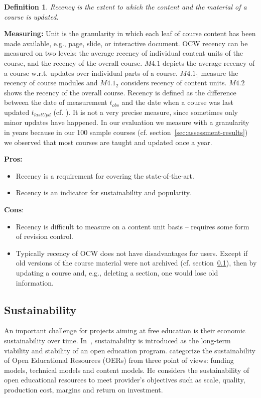 \documentclass{sig-alternate}
\theoremstyle{definition}
\newtheorem{defn}{Definition}
\begin{document}
\begin{defn}
\emph{Recency is the extent to which the content and the material of a course is updated.}
\end{defn}

\noindent\textbf{Measuring:}
Unit is the granularity in which each leaf of course content has been made available, e.g., page, slide, or interactive document.
OCW recency can be measured on two levels: the average recency of individual content units of the course, and the recency of the overall course.
$M4.1$ depicts the average recency of a course w.r.t. updates over individual parts of a course.
$M4.1_1$ measure the recency of course modules and $M4.1_2$ considers recency of content units. 
$M4.2$ shows the recency of the overall course.
Recency is defined as the difference between the date of measurement $t_{\mathit{obs}}$ and the date when a course was last updated $t_{\mathit{lastUpd}}$ (cf. \parencite{BaezaYates.2004}).
It is not a very precise measure, since sometimes only minor updates have happened.
In our evaluation we measure with a granularity in years because in our 100 sample courses (cf. section~\ref{sec:assessment-results}) we observed that most courses are taught and updated once a year.

\noindent\textbf{Pros:}
\begin{itemize}
\item Recency is a requirement for covering the state-of-the-art.
\item Recency is an indicator for sustainability and popularity.
\end{itemize}
\noindent\textbf{Cons}:
\begin{itemize}
\item Recency is difficult to measure on a content unit basis -- requires some form of revision control.
\item Typically recency of OCW does not have disadvantages for users.
Except if old versions of the course material were not archived (cf. section~\ref{sec:sustainability}), then by updating a course and, e.g., deleting a section, one would lose old information.
\end{itemize}

\subsection{Sustainability}
\label{sec:sustainability}
An important challenge for projects aiming at free education is their economic sustainability over time.
In~\parencite{Dholakia.2006}, sustainability is introduced as the long-term viability and stability of an open education program.
 categorize the sustainability of Open Educational Resources (OERs) from three point of views: funding models, technical models and content models.
He considers the sustainability of open educational resources to meet provider's objectives such as scale, quality, production cost, margins and return on investment.
\end{document}

